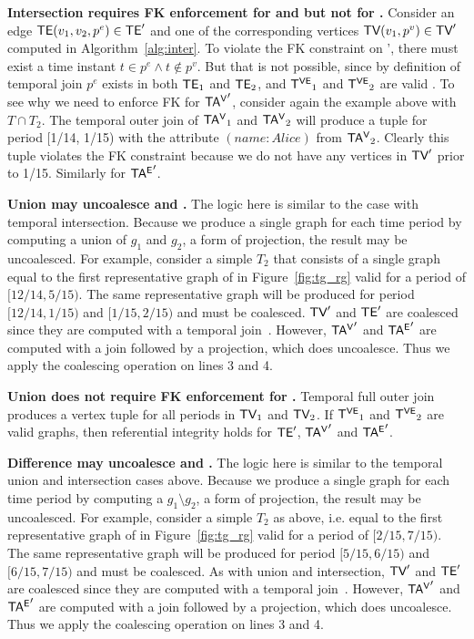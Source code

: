 {\bf Intersection requires FK enforcement for \tav and \tae but not
  for \te.}   Consider an edge $\textsf{TE}(v_1, v_2, p^e) \in \textsf{TE}'$ and
one of the corresponding vertices $\textsf{TV}(v_1, p^v) \in \textsf{TV}'$ computed in
Algorithm~\ref{alg:inter}.  To violate the FK constraint on \te',
there must exist a time instant $t \in p^e \wedge t \not\in p^v$.  But
that is not possible, since by definition of temporal join $p^e$
exists in both $\textsf{TE}_1$ and $\textsf{TE}_2$, and $\mathsf{T^{VE}}_1$ and $\mathsf{T^{VE}}_2$ are
valid \tgs.  To see why we need to enforce FK for $\mathsf{TA^{V}}'$, consider
again the example above with $T \cap T_2$.  The temporal outer join of
$\mathsf{TA^{V}}_1$ and $\mathsf{TA^{V}}_2$ will produce a tuple for period [1/14, 1/15)
  with the attribute $(name:Alice)$ from $\mathsf{TA^{V}}_2$.  Clearly this tuple
  violates the FK constraint because we do not have any vertices in
  $\textsf{TV}'$ prior to 1/15.  Similarly for $\mathsf{TA^{E}}'$.

{\bf Union may uncoalesce \tve and \trg.}  The logic here is similar
to the case with temporal intersection.  Because we produce a single
graph for each time period by computing a union of $g_1$ and $g_2$, a
form of projection, the result may be uncoalesced.  For example,
consider a simple \tg $T_2$ that consists of a single graph equal to
the first representative graph of  in Figure~\ref{fig:tg_rg}
valid for a period of $[12/14, 5/15)$.  The same representative graph
  will be produced for period $[12/14, 1/15)$ and $[1/15, 2/15)$ and
      must be coalesced.  $\textsf{TV}'$ and $\textsf{TE}'$ are coalesced since they
      are computed with a temporal
      join~\cite{DBLP:conf/vldb/BohlenSS96}.  However, $\mathsf{TA^{V}}'$ and
      $\mathsf{TA^{E}}'$ are computed with a join followed by a projection, which
      does uncoalesce.  Thus we apply the coalescing operation on
      lines 3 and 4.

{\bf Union does not require FK enforcement for \tve.} Temporal full
outer join produces a vertex tuple for all periods in $\textsf{TV}_1$ and
$\textsf{TV}_2$.  If $\mathsf{T^{VE}}_1$ and $\mathsf{T^{VE}}_2$ are valid graphs, then 
referential integrity holds for $\textsf{TE}'$, $\mathsf{TA^{V}}'$ and $\mathsf{TA^{E}}'$.

{\bf Difference may uncoalesce \tve and \trg.}  The logic here is
similar to the temporal union and intersection cases above.  Because
we produce a single graph for each time period by computing a $g_1
\setminus g_2$, a form of projection, the result may be uncoalesced.
For example, consider a simple \tg $T_2$ as above, i.e. equal to the
first representative graph of  in Figure~\ref{fig:tg_rg}
valid for a period of $[2/15, 7/15)$.  The same representative graph
  will be produced for period $[5/15, 6/15)$ and $[6/15, 7/15)$ and
      must be coalesced.  As with union and intersection, $\textsf{TV}'$ and
      $\textsf{TE}'$ are coalesced since they are computed with a temporal
      join~\cite{DBLP:conf/vldb/BohlenSS96}.  However, $\mathsf{TA^{V}}'$ and
      $\mathsf{TA^{E}}'$ are computed with a join followed by a projection, which
      does uncoalesce.  Thus we apply the coalescing operation on
      lines 3 and 4.

